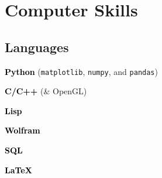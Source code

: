 \documentclass[10pt]{article}
\newcommand{\point}[1]{\textcolor{black}{\textbf{#1}}}
\newcommand\pitem[1]{\item{\point{#1}}}
\begin{document}
\section{Computer Skills}
\vspace{-1.7em}
\begin{multicols}{2}
\subsection{Languages}
\begin{brag}
\pitem{Python}
\hspace{0.5em}
(\texttt{matplotlib}, \texttt{numpy}, and \texttt{pandas})
\pitem{C/C++}
\hspace{0.5em} (\& OpenGL)
\pitem{Lisp}
\pitem{Wolfram}
\pitem{SQL}

\pitem{\LaTeX}
\end{brag}
\columnbreak

\end{multicols}
\end{document}
